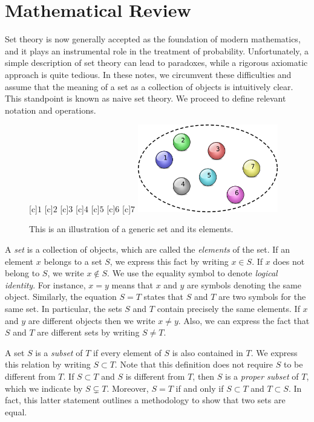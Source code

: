 \chapter{Mathematical Review}

Set theory is now generally accepted as the foundation of modern mathematics, and it plays an instrumental role in the treatment of probability.
Unfortunately, a simple description of set theory can lead to paradoxes, while a rigorous axiomatic approach is quite tedious.
In these notes, we circumvent these difficulties and assume that the meaning of a set as a collection of objects is intuitively clear.
This standpoint is known as naive set theory.
We proceed to define relevant notation and operations.

\begin{figure}[htb]
\begin{center}
\begin{psfrags}
[c]{$1$}
[c]{$2$}
[c]{$3$}
[c]{$4$}
[c]{$5$}
[c]{$6$}
[c]{$7$}
\includegraphics[height=3.825cm]{Figures/1Chapter/basicset}
\end{psfrags}
\caption{This is an illustration of a generic set and its elements.}
\end{center}
\end{figure}

A \emph{set} is a collection of objects, which are called the \emph{elements} of the set.
If an element $x$ belongs to a set $S$, we express this fact by writing $x \in S$.
If $x$ does not belong to $S$, we write $x \notin S$.
We use the equality symbol to denote \emph{logical identity}.
For instance, $x = y$ means that $x$ and $y$ are symbols denoting the same object.
Similarly, the equation $S = T$ states that $S$ and $T$ are two symbols for the same set.
In particular, the sets $S$ and $T$ contain precisely the same elements.
If $x$ and $y$ are different objects then we write $x \neq y$.
Also, we can express the fact that $S$ and $T$ are different sets by writing $S \neq T$.

A set $S$ is a \emph{subset} of $T$ if every element of $S$ is also contained in $T$.
We express this relation by writing $S \subset T$.
Note that this definition does not require $S$ to be different from $T$.
If $S \subset T$ and $S$ is different from $T$, then $S$ is a \emph{proper subset} of $T$, which we indicate by $S \subsetneq T$.
Moreover, $S = T$ if and only if $S \subset T$ and $T \subset S$.
In fact, this latter statement outlines a methodology to show that two sets are equal.


